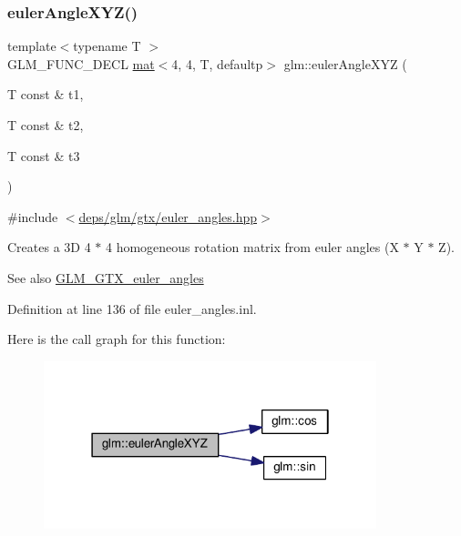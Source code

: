\subsubsection{\texorpdfstring{euler\+Angle\+X\+Y\+Z()}{eulerAngleXYZ()}}
{\footnotesize\ttfamily template$<$typename T $>$ \\
G\+L\+M\+\_\+\+F\+U\+N\+C\+\_\+\+D\+E\+CL \hyperlink{structglm_1_1mat}{mat}$<$4, 4, T, defaultp$>$ glm\+::euler\+Angle\+X\+YZ (\begin{DoxyParamCaption}\item[{T const \&}]{t1,  }\item[{T const \&}]{t2,  }\item[{T const \&}]{t3 }\end{DoxyParamCaption})}



{\ttfamily \#include $<$\hyperlink{euler__angles_8hpp}{deps/glm/gtx/euler\+\_\+angles.\+hpp}$>$}

Creates a 3D 4 $\ast$ 4 homogeneous rotation matrix from euler angles (X $\ast$ Y $\ast$ Z). \begin{DoxySeeAlso}{See also}
\hyperlink{group__gtx__euler__angles}{G\+L\+M\+\_\+\+G\+T\+X\+\_\+euler\+\_\+angles} 
\end{DoxySeeAlso}


Definition at line 136 of file euler\+\_\+angles.\+inl.

Here is the call graph for this function\+:
\nopagebreak
\begin{figure}[H]
\begin{center}
\leavevmode
\includegraphics[width=274pt]{d2/d7e/group__gtx__euler__angles_ga1975e0f0e9bed7f716dc9946da2ab645_cgraph}
\end{center}
\end{figure}
\mbox{\label{group__gtx__euler__angles_gaa39bd323c65c2fc0a1508be33a237ce9}} 
